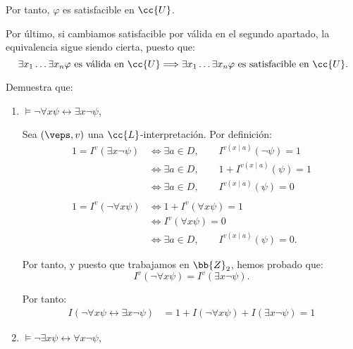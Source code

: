\begin{ejercicio}
\begin{description}
        Por tanto, $\varphi$ es satisfacible en $\cc{U}$.
    \end{description}

    Por último, si cambiamos satisfacible por válida en el segundo apartado, la equivalencia sigue siendo cierta, puesto que:
    \begin{equation*}
        \exists x_1 \ldots \exists x_n \varphi\text{ es válida en }\cc{U}\Longrightarrow
        \exists x_1 \ldots \exists x_n \varphi\text{ es satisfacible en }\cc{U}.
    \end{equation*}
        
\end{ejercicio}

\begin{ejercicio}\label{ej:2.6}
    Demuestra que:
    \begin{enumerate}
        \item $\models \neg \forall x \psi \leftrightarrow \exists x \neg \psi$,
        
        Sea $(\veps,v)$ una $\cc{L}$-interpretación. Por definición:
        \begin{align*}
            1 = I^v(\exists x \neg \psi)
            &\iff \exists a\in D,\qquad I^{v(x\mid a)}(\neg \psi) = 1\\
            &\iff \exists a\in D,\qquad 1+I^{v(x\mid a)}(\psi) = 1\\
            &\iff \exists a\in D,\qquad I^{v(x\mid a)}(\psi) = 0\\\\
            1 = I^v(\neg \forall x \psi)
            &\iff 1+I^v(\forall x \psi) = 1\\
            &\iff I^{v}( \forall x \psi) = 0\\
            &\iff \exists a\in D,\qquad I^{v(x\mid a)}(\psi) = 0.
        \end{align*}

        Por tanto, y puesto que trabajamos en $\bb{Z}_2$, hemos probado que:
        \begin{equation*}
            I^v(\neg \forall x \psi) =I^v(\exists x \neg \psi).
        \end{equation*}

        Por tanto:
        \begin{align*}
            I( \neg \forall x \psi \leftrightarrow \exists x \neg \psi)
            &= 1+I(\neg \forall x \psi)+I(\exists x \neg \psi)=1
        \end{align*}
        \item $\models \neg \exists x \psi \leftrightarrow \forall x \neg \psi$,
        

\end{enumerate}
\end{ejercicio}
